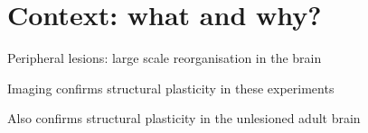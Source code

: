\section{Context: what and why?}
\begin{frame}[c]{Peripheral lesions: large scale reorganisation in the brain}
  \begin{itemize}
    \item {}
  \pause{}
  \scriptsize{
      \item {}
      \item {}
      \item {}
      \item {}
      \item {}
      }
  \end{itemize}
\end{frame}
\begin{frame}[c]{Imaging confirms structural plasticity in these experiments}
    \begin{itemize}
      \item {}
        \pause{}
        \footnotesize{
      \item {}
      \item {}
      \item {}
      \item {}
      }
    \end{itemize}
\end{frame}
\begin{frame}[c]{Also confirms structural plasticity in the unlesioned adult brain}
    \begin{itemize}
      \item {}
        \pause{}
        \footnotesize{
      \item {}
      \item {}
      \item {}
      \item {}
      }
    \end{itemize}
\end{frame}
